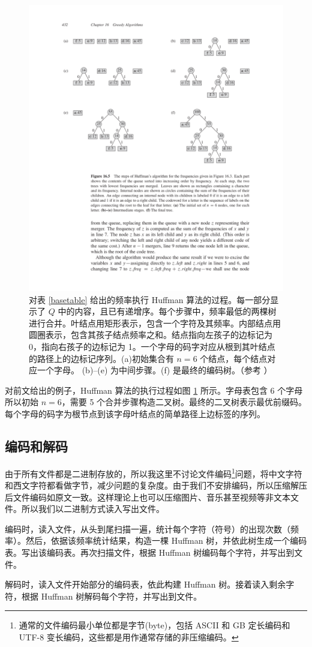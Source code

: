 \begin{figure}[htbp]
\centering
\includegraphics[trim=28mm 102mm 22mm 24mm,clip]{image/clrs_huffman.pdf}
\caption{\label{clrs_huffman} 对表 \ref{basetable} 给出的频率执行 Huffman 算法的过程。每一部分显示了 $Q$ 中的内容，且已有递增序。每个步骤中，频率最低的两棵树进行合并。叶结点用矩形表示，包含一个字符及其频率。内部结点用圆圈表示，包含其孩子结点频率之和。结点指向左孩子的边标记为 0，指向右孩子的边标记为 1。一个字母的码字对应从根到其叶结点的路径上的边标记序列。(a)初始集合有 $n=6$ 个结点，每个结点对应一个字母。 (b)--(e) 为中间步骤。(f) 是最终的编码树。（参考 \cite{clrs}）}
\end{figure}

对前文给出的例子，Huffman 算法的执行过程如图 \ref{clrs_huffman} 所示。字母表包含 6 个字母所以初始 $n=6$，需要 5 个合并步骤构造二叉树。最终的二叉树表示最优前缀码。每个字母的码字为根节点到该字母叶结点的简单路径上边标签的序列。

\subsection{编码和解码}

由于所有文件都是二进制存放的，所以我这里不讨论文件编码\footnote{通常的文件编码最小单位都是字节(byte)，包括 ASCII 和 GB 定长编码和 UTF-8 变长编码，这些都是用作通常存储的非压缩编码。}问题，将中文字符和西文字符都看做字节，减少问题的复杂度。由于我们不安排编码，所以压缩解压后文件编码如原文一致。这样理论上也可以压缩图片、音乐甚至视频等非文本文件。所以我们以二进制方式读入写出文件。

编码时，读入文件，从头到尾扫描一遍，统计每个字符（符号）的出现次数（频率）。然后，依据该频率统计结果，构造一棵 Huffman 树，并依此树生成一个编码表。写出该编码表。再次扫描文件，根据 Huffman 树编码每个字符，并写出到文件。

解码时，读入文件开始部分的编码表，依此构建 Huffman 树。接着读入剩余字符，根据 Huffman 树解码每个字符，并写出到文件。
